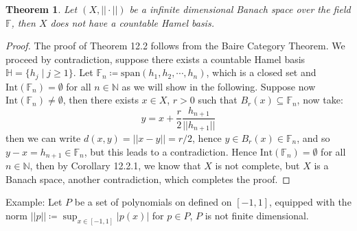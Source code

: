 \documentclass[11pt]{book}
\theoremstyle{break}
\theoremstyle{break}
\newtheorem{thm}{Theorem}[section]
\newcommand{\N}{\mathbb{N}}
\newcommand{\Int}{\text{Int}}
\newcommand{\spa}{\text{span}}
\newcommand{\example}{\color{green}Example: \color{black}}
\begin{document}
\begin{thm}
Let $(X,||\cdot ||)$ be a infinite dimensional Banach space over the field $\mathbb{F}$, then $X$ does not have a countable Hamel basis. 
\end{thm}
\begin{proof}
The proof of Theorem 12.2 follows from the Baire Category Theorem. We proceed by contradiction, suppose there exists a countable Hamel basis $\mathbb{H} = \{ h_j \mid j \geq 1\}$. Let $\mathbb{F}_n \coloneqq \spa (h_1,h_2,\cdots, h_n)$, which is a closed set and $\Int(\mathbb{F}_n) = \emptyset$ for all $n \in \N$ as we will show in the following. Suppose now $\Int(\mathbb{F}_n) \neq \emptyset$, then there exists $x \in X$, $r>0$ such that $B_r(x) \subseteq \mathbb{F}_n$, now take: 
$$y = x+ \frac{r}{2} \frac{h_{n+1}}{||h_{n+1}||}$$ 
then we can write $d(x,y) = ||x-y|| = r/2$, hence $y \in B_r(x) \in \mathbb{F}_n$, and so $y-x = h_{n+1} \in \mathbb{F}_n$, but this leads to a contradiction. Hence $\Int(\mathbb{F}_n) = \emptyset$ for all $n \in \N$, then by Corollary 12.2.1, we know that $X$ is not complete, but $X$ is a Banach space, another contradiction, which completes the proof. 
\end{proof}


\example Let $P$ be a set of polynomials on defined on $[-1,1]$, equipped with the norm $||p||\coloneqq \sup_{x\in [-1,1]} |p(x)|$ for $p \in P$, $P$ is not finite dimensional.
\end{document}
